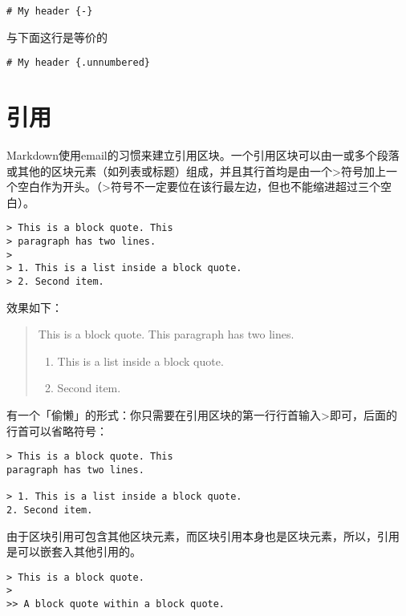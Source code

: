 \documentclass[cn]{elegantbook}
\providecommand{\tightlist}{%
  \setlength{\itemsep}{0pt}\setlength{\parskip}{0pt}}
\begin{document}
\begin{lstlisting}
# My header {-}
\end{lstlisting}

与下面这行是等价的

\begin{lstlisting}
# My header {.unnumbered}
\end{lstlisting}

\hypertarget{ux5f15ux7528}{%
\section{引用}\label{ux5f15ux7528}}

Markdown使用email的习惯来建立引用区块。一个引用区块可以由一或多个段落
或其他的区块元素（如列表或标题）组成，并且其行首均是由一个\textgreater 符号加上一
个空白作为开头。（\textgreater 符号不一定要位在该行最左边，但也不能缩进超过三个空白）。

\begin{lstlisting}
> This is a block quote. This
> paragraph has two lines.
>
> 1. This is a list inside a block quote.
> 2. Second item.
\end{lstlisting}

效果如下：

\begin{quote}
This is a block quote. This paragraph has two lines.

\begin{enumerate}
\def\labelenumi{\arabic{enumi}.}
\tightlist
\item
  This is a list inside a block quote.
\item
  Second item.
\end{enumerate}
\end{quote}

有一个「偷懒」的形式：你只需要在引用区块的第一行行首输入\textgreater 即可，后面的
行首可以省略符号：

\begin{lstlisting}
> This is a block quote. This
paragraph has two lines.

> 1. This is a list inside a block quote.
2. Second item.
\end{lstlisting}

由于区块引用可包含其他区块元素，而区块引用本身也是区块元素，所以，引用
是可以嵌套入其他引用的。

\begin{lstlisting}
> This is a block quote.
>
>> A block quote within a block quote.
\end{lstlisting}
\end{document}
